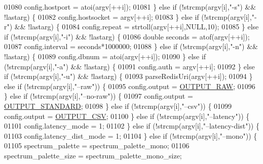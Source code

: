 \begin{DoxyCode}
{{{{{{{{{{{{{{{{{{{{{{{{{{{{{01080             config.hostport = atoi(argv[++i]);
01081         \} \textcolor{keywordflow}{else} \textcolor{keywordflow}{if} (!strcmp(argv[i],\textcolor{stringliteral}{"-s"}) && !lastarg) \{
01082             config.hostsocket = argv[++i];
01083         \} \textcolor{keywordflow}{else} \textcolor{keywordflow}{if} (!strcmp(argv[i],\textcolor{stringliteral}{"-r"}) && !lastarg) \{
01084             config.repeat = strtoll(argv[++i],NULL,10);
01085         \} \textcolor{keywordflow}{else} \textcolor{keywordflow}{if} (!strcmp(argv[i],\textcolor{stringliteral}{"-i"}) && !lastarg) \{
01086             \textcolor{keywordtype}{double} seconds = atof(argv[++i]);
01087             config.interval = seconds*1000000;
01088         \} \textcolor{keywordflow}{else} \textcolor{keywordflow}{if} (!strcmp(argv[i],\textcolor{stringliteral}{"-n"}) && !lastarg) \{
01089             config.dbnum = atoi(argv[++i]);
01090         \} \textcolor{keywordflow}{else} \textcolor{keywordflow}{if} (!strcmp(argv[i],\textcolor{stringliteral}{"-a"}) && !lastarg) \{
01091             config.auth = argv[++i];
01092         \} \textcolor{keywordflow}{else} \textcolor{keywordflow}{if} (!strcmp(argv[i],\textcolor{stringliteral}{"-u"}) && !lastarg) \{
01093             parseRedisUri(argv[++i]);
01094         \} \textcolor{keywordflow}{else} \textcolor{keywordflow}{if} (!strcmp(argv[i],\textcolor{stringliteral}{"--raw"})) \{
01095             config.output = \hyperlink{redis-cli_8c_a4f47017b54da140967dcbd440fae227c}{OUTPUT\_RAW};
01096         \} \textcolor{keywordflow}{else} \textcolor{keywordflow}{if} (!strcmp(argv[i],\textcolor{stringliteral}{"--no-raw"})) \{
01097             config.output = \hyperlink{redis-cli_8c_abf624f04f4590979c3c3944bc7f94d6e}{OUTPUT\_STANDARD};
01098         \} \textcolor{keywordflow}{else} \textcolor{keywordflow}{if} (!strcmp(argv[i],\textcolor{stringliteral}{"--csv"})) \{
01099             config.output = \hyperlink{redis-cli_8c_a55fcc3cb9516c34eebf22ac9f8ebf3a2}{OUTPUT\_CSV};
01100         \} \textcolor{keywordflow}{else} \textcolor{keywordflow}{if} (!strcmp(argv[i],\textcolor{stringliteral}{"--latency"})) \{
01101             config.latency\_mode = 1;
01102         \} \textcolor{keywordflow}{else} \textcolor{keywordflow}{if} (!strcmp(argv[i],\textcolor{stringliteral}{"--latency-dist"})) \{
01103             config.latency\_dist\_mode = 1;
01104         \} \textcolor{keywordflow}{else} \textcolor{keywordflow}{if} (!strcmp(argv[i],\textcolor{stringliteral}{"--mono"})) \{
01105             spectrum\_palette = spectrum\_palette\_mono;
01106             spectrum\_palette\_size = spectrum\_palette\_mono\_size;
}}}}}}}}}}}}}}}}}}}}}}}}}}}}}
\end{DoxyCode}
